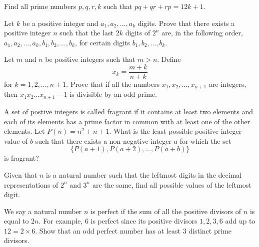 \documentclass[problems.tex]{subfile}
\begin{document}
	\begin{problem}[IberoAmerican 2016]
		Find all prime numbers $p,q,r,k$ such that $pq+qr+rp = 12k+1$. %
	\end{problem}

	\begin{problem}[IberoAmerican 2016]
		Let $k$ be a positive integer and $a_1, a_2,\dots, a_k$ digits. Prove that there exists a positive integer $n$ such that the last $2k$ digits of $2^n$ are, in the following order, $a_1, a_2,\dots, a_k , b_1, b_2, \dots, b_k$, for certain digits $b_1, b_2, \dots, b_k$. %
	\end{problem}

	\begin{problem}
		Let $m$ and $n$ be positive integers such that $m>n$. Define $$x_k=\frac{m+k}{n+k}$$ for $k=1,2,\ldots,n+1$. Prove that if all the numbers $x_1,x_2,\ldots,x_{n+1}$ are integers, then $x_1x_2\ldots x_{n+1}-1$ is divisible by an odd prime. %
	\end{problem}

	\begin{problem}[IMO 2016]
		A set of postive integers is called fragrant if it contains at least two elements and each of its elements has a prime factor in common with at least one of the other elements. Let $P(n)=n^2+n+1$. What is the least possible positive integer value of $b$ such that there exists a non-negative integer $a$ for which the set $$\{P(a+1),P(a+2),\ldots,P(a+b)\}$$is fragrant? %
	\end{problem}

	\begin{problem}
		Given that $n$ is a natural number such that the leftmost digits in the decimal representations of $2^n$ and $3^n$ are the same, find all possible values of the leftmost digit. %
	\end{problem}

	\begin{problem}
		We say a natural number $n$ is perfect if the sum of all the positive divisors of $n$ is equal to $2n$. For example, $6$ is perfect since its positive divisors $1,2,3,6$ add up to $12=2\times 6$. Show that an odd perfect number has at least $3$ distinct prime divisors. %
	\end{problem}
\end{document}
